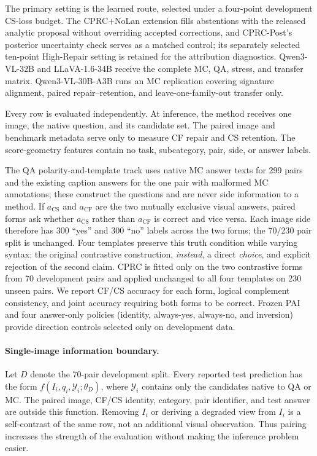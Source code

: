 \documentclass[letterpaper]{article}
\begin{document}
The primary setting is the learned route, selected under a four-point
development CS-loss budget. The CPRC+NoLan extension fills abstentions with
the released analytic proposal without overriding accepted corrections, and
CPRC-Post's posterior uncertainty check serves as a matched control; its
separately selected ten-point High-Repair setting is retained for the
attribution diagnostics.
Qwen3-VL-32B \cite{bai2025qwen3vl} and LLaVA-1.6-34B
\cite{liu2024llavabaselines} receive the complete MC, QA, stress, and transfer
matrix. Qwen3-VL-30B-A3B \cite{bai2025qwen3vl} runs an MC
replication covering signature alignment, paired repair--retention, and
leave-one-family-out transfer only.

Every row is evaluated independently. At inference, the method receives one
image, the native question, and its candidate set. The paired image and benchmark
metadata serve only to measure CF repair and CS retention. The score-geometry
features contain no task, subcategory, pair, side, or answer labels.

The QA polarity-and-template track uses native MC answer texts for 299 pairs and
the existing caption answers for the one pair with malformed MC annotations;
these construct the questions and are never side information to a method. If
$a_{\mathrm{CS}}$ and $a_{\mathrm{CF}}$ are the two mutually exclusive visual
answers, paired forms ask whether $a_{\mathrm{CS}}$ rather than
$a_{\mathrm{CF}}$ is correct and vice versa. Each image side therefore has 300
``yes'' and 300 ``no'' labels across the two forms; the 70/230 pair split is
unchanged. Four templates preserve this truth condition while varying syntax:
the original contrastive construction, \emph{instead}, a direct \emph{choice},
and explicit rejection of the second claim. CPRC is fitted only on the two
contrastive forms from 70 development pairs and applied unchanged to all four
templates on 230 unseen pairs. We report CF/CS accuracy for each form, logical
complement consistency, and joint accuracy requiring both forms to be correct.
Frozen PAI \cite{liu2024pai} and four answer-only policies (identity, always-yes, always-no, and
inversion) provide direction controls selected only on development data.

\paragraph{Single-image information boundary.}
Let $D$ denote the 70-pair development split. Every reported test prediction has
the form $f(I_i,q_i,\mathcal{Y}_i;\theta_D)$, where $\mathcal{Y}_i$ contains
only the candidates native to QA or MC. The paired image, CF/CS identity,
category, pair identifier, and test answer are outside this function. Removing
$I_i$ or deriving a degraded view from $I_i$ is a self-contrast of the same row,
not an additional visual observation. Thus pairing increases the strength of
the evaluation without making the inference problem easier.
\end{document}
